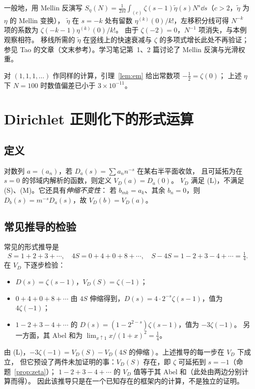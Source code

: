 \documentclass[11pt]{article}
\begin{document}
\begin{remark}
一般地，用 Mellin 反演写
$S_\eta(N)=\frac1{2\pi\ii}\int_{(c)}\zeta(s-1)\tilde\eta(s)N^s\dd s$（$c>2$，$\tilde\eta$ 为 $\eta$ 的 Mellin 变换），
$\tilde\eta$ 在 $s=-k$ 处有留数 $\eta^{(k)}(0)/k!$，左移积分线可得
$N^{-k}$ 项的系数为 $\zeta(-k-1)\eta^{(k)}(0)/k!$。
由于 $\zeta(-2)=0$，$N^{-1}$ 项消失，与本例观察相符。
移线所需的 $\tilde\eta$ 在竖线上的快速衰减与 $\zeta$ 的多项式增长此处不再验证；
参见 Tao 的文章（文末参考）。学习笔记第~1、2 篇讨论了 Mellin 反演与光滑权重。
\end{remark}

对 $(1,1,1,\ldots)$ 作同样的计算，引理~\ref{lem:em} 给出常数项 $-\tfrac12=\zeta(0)$；
上述 $\eta$ 下 $N=100$ 时数值偏差已小于 $3\times10^{-11}$。

\section{Dirichlet 正则化下的形式运算}
\subsection{定义}
对数列 $a=(a_n)$，若 $D_a(s)=\sum a_nn^{-s}$ 在某右半平面收敛，
且可延拓为在 $s=0$ 的邻域内解析的函数，则定义 $V_D(a)=D_a(0)$。
$V_D$ 满足 (L)，不满足 (S)、(M)。它还具有\emph{伸缩不变性}：
若 $b_{mk}=a_k$、其余 $b_n=0$，则 $D_b(s)=m^{-s}D_a(s)$，故 $V_D(b)=V_D(a)$。

\subsection{常见推导的检验}
常见的形式推导是
\[
 S=1+2+3+\cdots,\quad 4S=0+4+0+8+\cdots,\quad S-4S=1-2+3-4+\cdots=\tfrac14 .
\]
在 $V_D$ 下逐步检验：
\begin{itemize}
 \item $D(s)=\zeta(s-1)$，$V_D(S)=\zeta(-1)$；
 \item $0+4+0+8+\cdots$ 由 $4S$ 伸缩得到，$D(s)=4\cdot2^{-s}\zeta(s-1)$，值为 $4\zeta(-1)$；
 \item $1-2+3-4+\cdots$ 的 $D(s)=(1-2^{2-s})\zeta(s-1)$，值为 $-3\zeta(-1)$。
 另一方面，其 Abel 和为 $\lim_{x\uparrow1}x/(1+x)^2=\tfrac14$。
\end{itemize}
由 (L)，$-3\zeta(-1)=V_D(S)-V_D(4S\text{ 的伸缩})$。上述推导的每一步在 $V_D$ 下成立，
但它预设了两件未加证明的事：$V_D(S)$ 存在，即 $\zeta$ 可延拓到 $s=-1$（命题~\ref{prop:zeta}）；
$1-2+3-4+\cdots$ 的 $V_D$ 值等于其 Abel 和（此处由两边分别计算而得）。
因此该推导只是在一个已知存在的框架内的计算，不是独立的证明。
\end{document}
